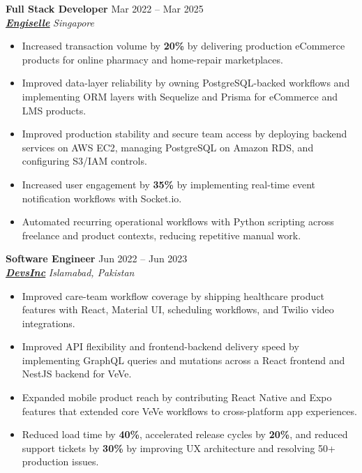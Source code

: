 \documentclass[9pt,letterpaper]{article}
\newcommand{\role}[4]{\textbf{#1} \hfill #2 \\
\textit{#3} \hfill \textit{#4}\\[-5pt]}
\begin{document}
\role{Full Stack Developer}{Mar 2022 -- Mar 2025}{\href{https://www.engiselle.com/}{\textbf{\underline{Engiselle}}}}{Singapore}
\begin{itemize}[leftmargin=*, itemsep=0pt, topsep=0pt, partopsep=0pt, parsep=0pt, after=\vspace{1pt}]
  \item Increased transaction volume by \textbf{20\%} by delivering production eCommerce products for online pharmacy and home-repair marketplaces.
  \item Improved data-layer reliability by owning PostgreSQL-backed workflows and implementing ORM layers with Sequelize and Prisma for eCommerce and LMS products.
  \item Improved production stability and secure team access by deploying backend services on AWS EC2, managing PostgreSQL on Amazon RDS, and configuring S3/IAM controls.
  \item Increased user engagement by \textbf{35\%} by implementing real-time event notification workflows with Socket.io.
  \item Automated recurring operational workflows with Python scripting across freelance and product contexts, reducing repetitive manual work.
\end{itemize}

\role{Software Engineer}{Jun 2022 -- Jun 2023}{\href{https://www.devsinc.com/}{\textbf{\underline{DevsInc}}}}{Islamabad, Pakistan}
\begin{itemize}[leftmargin=*, itemsep=0pt, topsep=0pt, partopsep=0pt, parsep=0pt, after=\vspace{1pt}]
  \item Improved care-team workflow coverage by shipping healthcare product features with React, Material UI, scheduling workflows, and Twilio video integrations.
  \item Improved API flexibility and frontend-backend delivery speed by implementing GraphQL queries and mutations across a React frontend and NestJS backend for VeVe.
  \item Expanded mobile product reach by contributing React Native and Expo features that extended core VeVe workflows to cross-platform app experiences.
  \item Reduced load time by \textbf{40\%}, accelerated release cycles by \textbf{20\%}, and reduced support tickets by \textbf{30\%} by improving UX architecture and resolving 50+ production issues.
\end{itemize}
\end{document}
